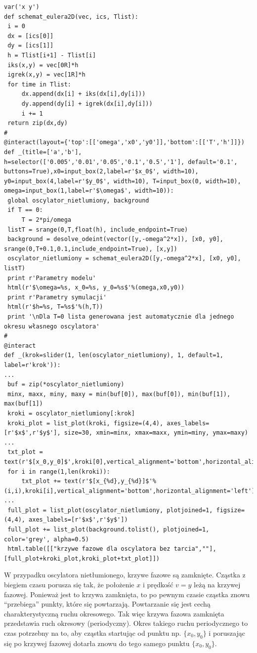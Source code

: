 \documentclass[a4paper,12pt,polish]{sphinxmanual}
\begin{document}
\begin{verbatim}
var('x y')
def schemat_eulera2D(vec, ics, Tlist):
 i = 0
 dx = [ics[0]]
 dy = [ics[1]]
 h = Tlist[i+1] - Tlist[i]
 iks(x,y) = vec[0R]*h
 igrek(x,y) = vec[1R]*h
 for time in Tlist:
     dx.append(dx[i] + iks(dx[i],dy[i]))
     dy.append(dy[i] + igrek(dx[i],dy[i]))
     i += 1
 return zip(dx,dy)
#
@interact(layout={'top':[['omega','x0','y0']],'bottom':[['T','h']]})
def _(title=['a','b'], h=selector(['0.005','0.01','0.05','0.1','0.5','1'], default='0.1', buttons=True),x0=input_box(2,label=r'$x_0$', width=10), y0=input_box(4,label=r'$y_0$', width=10), T=input_box(0, width=10), omega=input_box(1,label=r'$\omega$', width=10)):
 global oscylator_nietlumiony, background
 if T == 0:
     T = 2*pi/omega
 listT = srange(0,T,float(h), include_endpoint=True)
 background = desolve_odeint(vector([y,-omega^2*x]), [x0, y0], srange(0,T+0.1,0.1,include_endpoint=True), [x,y])
 oscylator_nietlumiony = schemat_eulera2D([y,-omega^2*x], [x0, y0], listT)
 print r'Parametry modelu'
 html(r'$\omega=%s, x_0=%s, y_0=%s$'%(omega,x0,y0))
 print r'Parametry symulacji'
 html(r'$h=%s, T=%s$'%(h,T))
 print '\nDla T=0 lista generowana jest automatycznie dla jednego okresu własnego oscylatora'
#
@interact
def _(krok=slider(1, len(oscylator_nietlumiony), 1, default=1, label=r'krok')):
...
 buf = zip(*oscylator_nietlumiony)
 minx, maxx, miny, maxy = min(buf[0]), max(buf[0]), min(buf[1]), max(buf[1])
 kroki = oscylator_nietlumiony[:krok]
 kroki_plot = list_plot(kroki, figsize=(4,4), axes_labels=[r'$x$',r'$y$'], size=30, xmin=minx, xmax=maxx, ymin=miny, ymax=maxy)
...
 txt_plot = text(r'$[x_0,y_0]$',kroki[0],vertical_alignment='bottom',horizontal_alignment='left')
 for i in range(1,len(kroki)):
     txt_plot += text(r'$[x_{%d},y_{%d}]$'%(i,i),kroki[i],vertical_alignment='bottom',horizontal_alignment='left')
...
 full_plot = list_plot(oscylator_nietlumiony, plotjoined=1, figsize=(4,4), axes_labels=[r'$x$',r'$y$'])
 full_plot += list_plot(background.tolist(), plotjoined=1, color='grey', alpha=0.5)
 html.table([["krzywe fazowe dla oscylatora bez tarcia",""],[full_plot+kroki_plot,kroki_plot+txt_plot]])
\end{verbatim}


W przypadku oscylatora nietłumionego, krzywe fazowe są zamknięte. Cząstka z biegiem czasu porusza się tak, że położenie $x$ i prędkość $v=y$  leżą na krzywej fazowej. Ponieważ jest to krzywa zamknięta, to po pewnym czasie cząstka znowu ``przebiega'' punkty, które się powtarzają. Powtarzanie się jest cechą charakterystyczną ruchu okresowego. Tak więc krzywa fazowa zamknięta przedstawia ruch okresowy (periodyczny). Okres takiego ruchu periodycznego to czas potrzebny na to, aby cząstka startując od punktu np. $\{x_0, y_0\}$ i  poruszając się po krzywej fazowej dotarła znowu do tego samego punktu  $\{x_0, y_0\}$.
\end{document}
